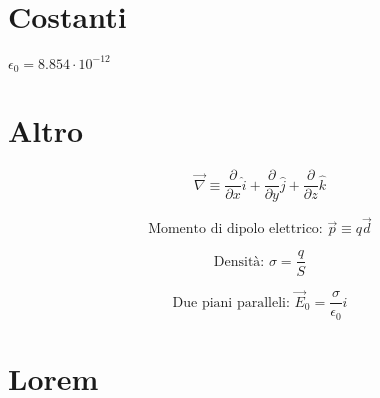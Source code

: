 \documentclass[a4paper,11pt]{article}
\begin{document}
\begin{multicols}{3}
		
		
		\section{Costanti}
		$\epsilon_{0}=8.854 \cdot 10^{-12}$
		
		
		
		\section{Altro}
		
		\begin{equation}
			\vec{\nabla} \equiv
			\frac{\partial}{\partial x}\hat{i} +
			\frac{\partial}{\partial y}\hat{j} +
			\frac{\partial}{\partial z}\hat{k}
		\end{equation}
		
		\begin{equation}
			\text{Momento di dipolo elettrico: }\vec{p} \equiv q \vec{d}
		\end{equation}
		
		\begin{equation}
			\text{Densità: } \sigma = \frac{q}{S}
		\end{equation}
		
		\begin{equation}
			\text{Due piani paralleli: }\vec{E}_0 = \frac{\sigma}{\epsilon_0} \hat{i}
		\end{equation}
		
		
		
		
		
		\section{Lorem}
		\lipsum[1-10]
	\end{multicols}
	
\end{document}
